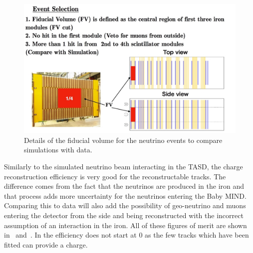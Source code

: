 \begin{figure}
\centering
\includegraphics[width=\textwidth]{figures/NeutrinoChap/NuFactTalk/eventRateCheck.jpeg}
\caption{Details of the fiducial volume for the neutrino events to compare simulations with data.}
\label{fig:MINDFiducial}
\end{figure}

Similarly to the simulated neutrino beam interacting in the TASD, the charge reconstruction efficiency is very good for the reconstructable tracks. The difference comes from the fact that the neutrinos are produced in the iron and that process adds more uncertainty for the neutrinos entering the Baby MIND. Comparing this to data will also add the possibility of geo-neutrino and muons entering the detector from the side and being reconstructed with the incorrect assumption of an interaction in the iron.  All of these figures of merit are shown in~ and~.
In  the efficiency does not start at 0 as the few tracks which have been fitted can provide a charge. 




